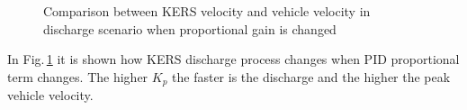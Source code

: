 \documentclass[11pt]{article}
\begin{document}
\begin{figure}[H]
	\centering
	 \\
	 \\
	\caption{Comparison between KERS velocity \protect{} and vehicle velocity in discharge scenario when proportional gain is changed \protect{}}
	\label{fig: kers vel plus vehicle vel comp}
\end{figure}

In Fig.\,\ref{fig: kers vel plus vehicle vel comp} it is shown how KERS discharge process changes when PID proportional term changes. The higher $K_p$ the faster is the discharge and the higher the peak vehicle velocity.
\end{document}
